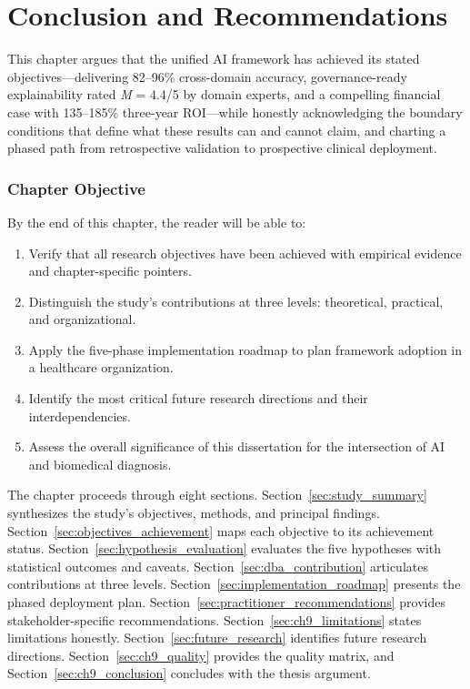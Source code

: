 
\chapter{Conclusion and Recommendations}
\label{chap:conclusion}

This chapter argues that the unified AI framework has achieved its stated objectives---delivering 82--96\% cross-domain accuracy, governance-ready explainability rated \textit{M} = 4.4/5 by domain experts, and a compelling financial case with 135--185\% three-year ROI---while honestly acknowledging the boundary conditions that define what these results can and cannot claim, and charting a phased path from retrospective validation to prospective clinical deployment.

\subsection{Chapter Objective}
\label{sec:ch9_objective}

By the end of this chapter, the reader will be able to:
\begin{enumerate}[label=\alph*)]
    \item Verify that all research objectives have been achieved with empirical evidence and chapter-specific pointers.
    \item Distinguish the study's contributions at three levels: theoretical, practical, and organizational.
    \item Apply the five-phase implementation roadmap to plan framework adoption in a healthcare organization.
    \item Identify the most critical future research directions and their interdependencies.
    \item Assess the overall significance of this dissertation for the intersection of AI and biomedical diagnosis.
\end{enumerate}

The chapter proceeds through eight sections. Section~\ref{sec:study_summary} synthesizes the study's objectives, methods, and principal findings. Section~\ref{sec:objectives_achievement} maps each objective to its achievement status. Section~\ref{sec:hypothesis_evaluation} evaluates the five hypotheses with statistical outcomes and caveats. Section~\ref{sec:dba_contribution} articulates contributions at three levels. Section~\ref{sec:implementation_roadmap} presents the phased deployment plan. Section~\ref{sec:practitioner_recommendations} provides stakeholder-specific recommendations. Section~\ref{sec:ch9_limitations} states limitations honestly. Section~\ref{sec:future_research} identifies future research directions. Section~\ref{sec:ch9_quality} provides the quality matrix, and Section~\ref{sec:ch9_conclusion} concludes with the thesis argument.


